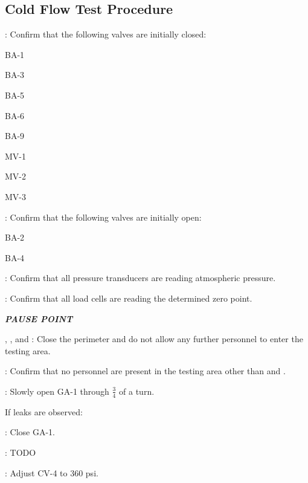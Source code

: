 \subsection{Cold Flow Test Procedure}
\begin{checklist}
    \item \primary{}: Confirm that the following valves are initially closed:
    \begin{checklist}
		\item BA-1
        \item BA-3
        \item BA-5
        \item BA-6
		\item BA-9
		\item MV-1
		\item MV-2
		\item MV-3
    \end{checklist}
    \item \primary{}: Confirm that the following valves are initially open:
    \begin{checklist}
  		\item BA-2
		\item BA-4
    \end{checklist}
    \item \daq{}: Confirm that all pressure transducers are reading atmospheric pressure.
    \item \daq{}: Confirm that all load cells are reading the determined zero point.
    \item \textbf{\textit{PAUSE POINT}}
    \item \peri{}, \perii{}, and \periii{}: Close the perimeter and do not allow any further personnel to enter the testing area.
    \item \secondary: Confirm that no personnel are present in the testing area other than \primary{} and \secondary.
    \item \primary{}: Slowly open GA-1 through $\frac{3}{4}$  of a turn.
    \begin{checklist}[label=$\bullet$]
        \item If leaks are observed:
        \begin{checklist}
            \item \primary{}: Close GA-1.
            \item \primary{}: TODO
        \end{checklist}
    \end{checklist}
    \item \primary{}: Adjust CV-4 to 360 psi.

\end{checklist}
